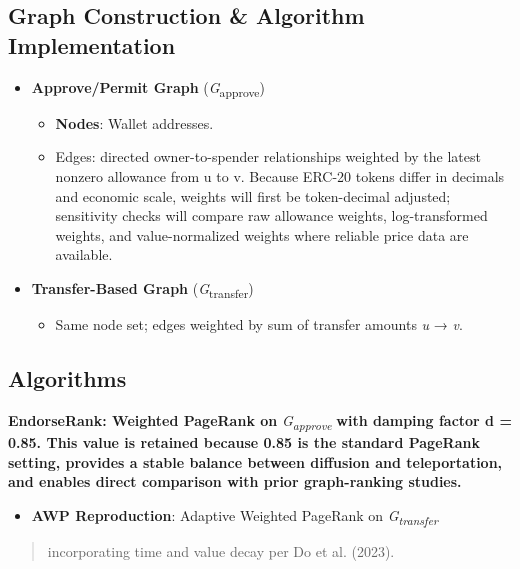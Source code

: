 \documentclass[
]{article}
\begin{document}
\subsection{Graph Construction \& Algorithm Implementation}\label{graph-construction-algorithm-implementation}

\begin{itemize}
\item
  \textbf{Approve/Permit Graph} (\emph{G}\textsubscript{approve})

  \begin{itemize}
  \item
    \textbf{Nodes}: Wallet addresses.
  \item
    Edges: directed owner-to-spender relationships weighted by the latest nonzero allowance from u to v. Because ERC-20 tokens differ in decimals and economic scale, weights will first be token-decimal adjusted; sensitivity checks will compare raw allowance weights, log-transformed weights, and value-normalized weights where reliable price data are available.
  \end{itemize}
\item
  \textbf{Transfer-Based Graph} (\emph{G}\textsubscript{transfer})

  \begin{itemize}
  \item
    Same node set; edges weighted by sum of transfer amounts \emph{u} → \emph{v}.
  \end{itemize}
\end{itemize}

\subsection{Algorithms}\label{algorithms}

\textbf{EndorseRank: Weighted PageRank on} \emph{G\textsubscript{approve}} \textbf{with damping factor d = 0.85. This value is retained because 0.85 is the standard PageRank setting, provides a stable balance between diffusion and teleportation, and enables direct comparison with prior graph-ranking studies.}

\begin{itemize}
\item
  \textbf{AWP Reproduction}: Adaptive Weighted PageRank on \emph{G\textsubscript{transfer}}
\end{itemize}

\begin{quote}
incorporating time and value decay per Do et al. (2023).
\end{quote}
\end{document}
